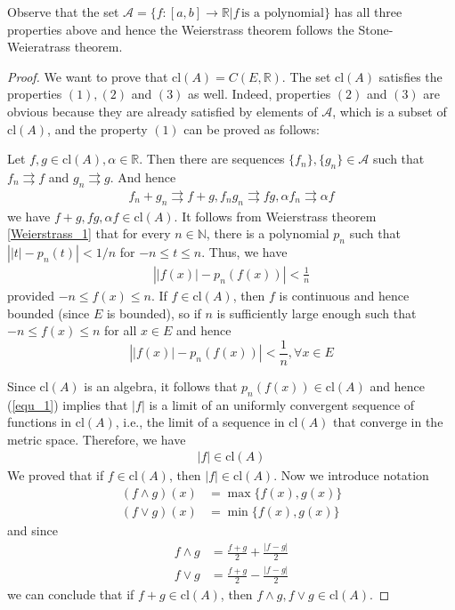 \documentclass[12pt,leqno]{amsart}
\theoremstyle{definition}
\numberwithin{equation}{subsection}
\begin{document}
Observe that the set $\mathcal{A} = \{f:[a,b]\to\mathbb{R} | f\, \text{is a polynomial}\}$ has all three properties above and hence the Weierstrass theorem follows the Stone-Weieratrass theorem. 
\begin{proof}
We want to prove that $\text{cl}(A) = C(E,\mathbb{R})$. The set $\text{cl}(A)$ satisfies the properties $(1),(2)$ and $(3)$ as well. Indeed, properties $(2)$ and $(3)$ are obvious because they are already satisfied by elements of $\mathcal{A}$, which is a subset of $\text{cl}(A)$, and the property $(1)$ can be proved as follows: 

Let $f,g\in \text{cl}(A), \alpha\in\mathbb{R}$. Then there are sequences $\{f_n\},\{g_n\}\in\mathcal{A}$ such that $f_n\rightrightarrows f$ and $g_n\rightrightarrows g$. And hence 
\begin{align*}
    f_n+g_n \rightrightarrows f+g,
    f_n g_n \rightrightarrows fg,
    \alpha f_n \rightrightarrows \alpha f
\end{align*}
we have $f+g,fg,\alpha f\in\text{cl}(A)$. It follows from Weierstrass theorem \ref{Weierstrass_1} that for every $n\in\mathbb{N}$, there is a polynomial $p_n$ such that $\left||t| - p_n(t)\right| < 1/n$ for $-n\leq t \leq n$. Thus, we have
\begin{align*}
    \left||f(x)| - p_n(f(x))\right| < \frac{1}{n}
\end{align*}
provided $-n \leq f(x) \leq n$. If $f\in\text{cl}(A)$, then $f$ is continuous and hence bounded (since $E$ is bounded), so if $n$ is sufficiently large enough such that $-n \leq f(x) \leq n$ for all $x\in E$ and hence 
\begin{equation}
    \label{equ_1}
    \left||f(x)| - p_n(f(x))\right| < \frac{1}{n}, \forall x\in E
\end{equation}

Since $\text{cl}(A)$  is an algebra, it follows that $p_n(f(x))\in\text{cl}(A)$ and hence (\ref{equ_1}) implies that $|f|$ is a limit of an uniformly convergent sequence of functions in $\text{cl}(A)$, i.e., the limit of a sequence in $\text{cl}(A)$ that converge in the metric space. Therefore, we have
\begin{align*}
    |f| \in \text{cl}(A)
\end{align*}
We proved that if $f\in\text{cl}(A)$, then $|f|\in\text{cl}(A)$. Now we introduce notation 
\begin{align*}
    (f \wedge g)(x) & = \max\{f(x),g(x)\}\\
    (f \vee g)(x) & = \min\{f(x),g(x)\}
\end{align*}
and since 
\begin{align*}
    f \wedge g & = \frac{f+g}{2} + \frac{|f-g|}{2} \\
    f \vee g & = \frac{f+g}{2} - \frac{|f-g|}{2}
\end{align*}
we can conclude that if $f+g\in\text{cl}(A)$, then $f\wedge g, f\vee g\in \text{cl}(A)$. 


\end{proof}
\end{document}
